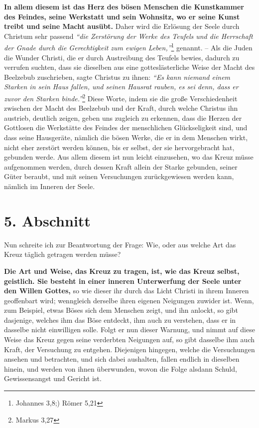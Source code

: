 \label{ref:03_04_reich_des_boesen}
\textbf{In allem diesem ist das Herz des bösen Menschen die Kunstkammer des
Feindes, seine Werkstatt und sein Wohnsitz, wo er seine Kunst treibt und seine
Macht ausübt.} Daher wird die Erlösung der Seele durch Christum sehr passend
\textit{"`die Zerstörung der Werke des Teufels und die Herrschaft der Gnade
durch die Gerechtigkeit zum ewigen Leben,"'}\footnote{Johannes 3,8;) Römer 5,21}
genannt. -- Als
die Juden die Wunder Christi, die er durch Austreibung des Teufels bewies,
dadurch zu verrufen suchten, dass sie dieselben aus eine gotteslästerliche Weise
der Macht des Beelzebub zuschrieben, sagte Christus zu ihnen:
\textit{"`Es kann niemand einem Starken in sein Haus fallen, und seinen
Hausrat rauben, es sei denn, dass er zuvor den Starken binde."'}\footnote{Markus
3,27}
Diese Worte, indem sie die
große Verschiedenheit zwischen der Macht des Beelzebub und der Kraft, durch
welche Christus ihn austrieb, deutlich zeigen, geben uns zugleich zu erkennen,
dass die Herzen der Gottlosen die Werkstätte des Feindes der menschlichen
Glückseligkeit sind, und dass seine Hausgeräte, nämlich die bösen Werke, die er
in dem Menschen wirkt, nicht eher zerstört werden können, bis er selbst, der
sie hervorgebracht hat, gebunden werde. Aus allem diesem ist nun leicht
einzusehen, wo das Kreuz müsse aufgenommen werden, durch dessen Kraft allein der
Starke gebunden, seiner Güter beraubt, und mit seinen Versuchungen
zurückgewiesen werden kann, nämlich im Inneren der Seele.

\section{5. Abschnitt} \label{kap3_ab5}

Nun schreite ich zur Beantwortung der Frage: Wie, oder aus welche Art das Kreuz
täglich getragen werden müsse?

\medskip

\label{ref:03_05_kreuz_auf_sich_nehmen}
\textbf{Die Art und Weise, das Kreuz zu tragen, ist, wie das Kreuz selbst,
geistlich.
Sie besteht in einer inneren Unterwerfung der Seele unter den Willen Gottes,} so
wie dieser ihr durch das Licht Christi in ihrem Inneren geoffenbart wird;
wenngleich derselbe ihren eigenen Neigungen zuwider ist. Wenn, zum Beispiel,
etwas Böses sich dem Menschen zeigt, und ihn anlockt, so gibt dasjenige,
welches ihm das Böse entdeckt, ihm auch zu verstehen, dass er in dasselbe nicht
einwilligen solle. Folgt er nun dieser Warnung, und nimmt auf diese Weise das
Kreuz gegen seine verderbten Neigungen auf, so gibt dasselbe ihm auch Kraft,
der Versuchung zu entgehen. Diejenigen hingegen, welche die Versuchungen ansehen
und betrachten, und sich dabei aushalten, fallen endlich in dieselben hinein,
und werden von ihnen überwunden, wovon die Folge alsdann Schuld, Gewissensangst
und Gericht ist.

